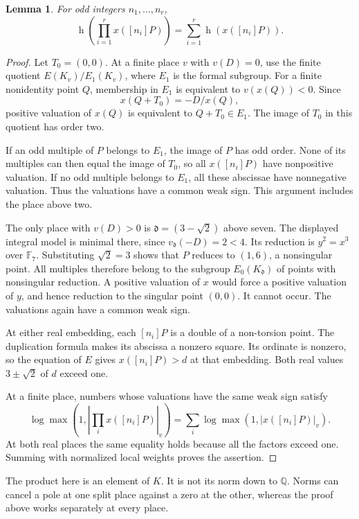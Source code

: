 \documentclass[11pt]{article}
\newtheorem{lemma}[theorem]{Lemma}
\newcommand{\Q}{\mathbb Q}
\newcommand{\F}{\mathbb F}
\newcommand{\htw}{\operatorname h}
\begin{document}
\begin{lemma}\label{lem:product}
For odd integers $n_1,\ldots,n_r$,
\[
 \htw\!\left(\prod_{i=1}^r x([n_i]P)\right)
 =\sum_{i=1}^r\htw(x([n_i]P)).
\]
\end{lemma}
\begin{proof}
Let $T_0=(0,0)$. At a finite place $v$ with $v(D)=0$, use the finite quotient $E(K_v)/E_1(K_v)$, where $E_1$ is the formal subgroup. For a finite nonidentity point $Q$, membership in $E_1$ is equivalent to $v(x(Q))<0$. Since
\[
 x(Q+T_0)=-D/x(Q),
\]
positive valuation of $x(Q)$ is equivalent to $Q+T_0\in E_1$. The image of $T_0$ in this quotient has order two.

If an odd multiple of $P$ belongs to $E_1$, the image of $P$ has odd order. None of its multiples can then equal the image of $T_0$, so all $x([n_i]P)$ have nonpositive valuation. If no odd multiple belongs to $E_1$, all these abscissae have nonnegative valuation. Thus the valuations have a common weak sign. This argument includes the place above two.

The only place with $v(D)>0$ is $\mathfrak d=(3-\sqrt2)$ above seven. The displayed integral model is minimal there, since $v_{\mathfrak d}(-D)=2<4$. Its reduction is $y^2=x^3$ over $\F_7$. Substituting $\sqrt2=3$ shows that $P$ reduces to $(1,6)$, a nonsingular point. All multiples therefore belong to the subgroup $E_0(K_{\mathfrak d})$ of points with nonsingular reduction. A positive valuation of $x$ would force a positive valuation of $y$, and hence reduction to the singular point $(0,0)$. It cannot occur. The valuations again have a common weak sign.

At either real embedding, each $[n_i]P$ is a double of a non-torsion point. The duplication formula makes its abscissa a nonzero square. Its ordinate is nonzero, so the equation of $E$ gives $x([n_i]P)>d$ at that embedding. Both real values $3\pm\sqrt2$ of $d$ exceed one.

At a finite place, numbers whose valuations have the same weak sign satisfy
\[
 \log\max\left(1,\left|\prod_i x([n_i]P)\right|_v\right)
 =\sum_i\log\max(1,|x([n_i]P)|_v).
\]
At both real places the same equality holds because all the factors exceed one. Summing with normalized local weights proves the assertion.
\end{proof}

The product here is an element of $K$. It is not its norm down to $\Q$. Norms can cancel a pole at one split place against a zero at the other, whereas the proof above works separately at every place.
\end{document}
